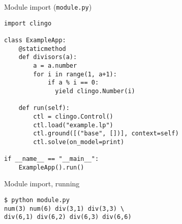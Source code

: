 \begin{frame}{Module import (\texttt{module.py})}
\begin{lstlisting}
import clingo

class ExampleApp:
    @staticmethod
    def divisors(a):
        a = a.number
        for i in range(1, a+1):
            if a % i == 0:
              yield clingo.Number(i)

    def run(self):
        ctl = clingo.Control()
        ctl.load("example.lp")
        ctl.ground([("base", [])], context=self)
        ctl.solve(on_model=print)

if __name__ == "__main__":
    ExampleApp().run()
\end{lstlisting}
\end{frame}
\begin{frame}[fragile]{Module import, running}
  \bigskip
\begin{lstlisting}
$ python module.py
num(3) num(6) div(3,1) div(3,3) \
div(6,1) div(6,2) div(6,3) div(6,6)
\end{lstlisting}
\end{frame}
%
